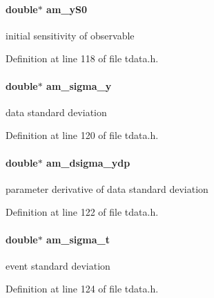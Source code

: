 \paragraph[{am\+\_\+y\+S0}]{\setlength{\rightskip}{0pt plus 5cm}double$\ast$ am\+\_\+y\+S0}\label{struct_temp_data_a3ddc8a88947f557500d6df4aeb09b18a}
initial sensitivity of observable 

Definition at line 118 of file tdata.\+h.

\hypertarget{struct_temp_data_aed7f1b33daffb581c6be404c0c5d12ac}{}
\paragraph[{am\+\_\+sigma\+\_\+y}]{\setlength{\rightskip}{0pt plus 5cm}double$\ast$ am\+\_\+sigma\+\_\+y}\label{struct_temp_data_aed7f1b33daffb581c6be404c0c5d12ac}
data standard deviation 

Definition at line 120 of file tdata.\+h.

\hypertarget{struct_temp_data_a8ffa0cf50a6827ba6f5964625d049a30}{}
\paragraph[{am\+\_\+dsigma\+\_\+ydp}]{\setlength{\rightskip}{0pt plus 5cm}double$\ast$ am\+\_\+dsigma\+\_\+ydp}\label{struct_temp_data_a8ffa0cf50a6827ba6f5964625d049a30}
parameter derivative of data standard deviation 

Definition at line 122 of file tdata.\+h.

\hypertarget{struct_temp_data_a6b326ec16453b4518b549856f913acbf}{}
\paragraph[{am\+\_\+sigma\+\_\+t}]{\setlength{\rightskip}{0pt plus 5cm}double$\ast$ am\+\_\+sigma\+\_\+t}\label{struct_temp_data_a6b326ec16453b4518b549856f913acbf}
event standard deviation 

Definition at line 124 of file tdata.\+h.

\hypertarget{struct_temp_data_a70d1dd9123f113a231825d6d58c92550}{}
